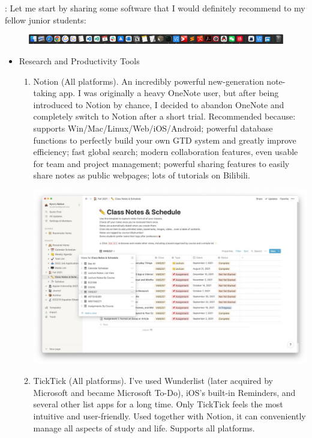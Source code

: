 \KW: Let me start by sharing some software that I would definitely recommend to my fellow junior students:
\begin{figure}[H]
    \includegraphics[width=\columnwidth]{author-folder/Kai.Wu/kai_mac_dock.jpg}
\end{figure}
\begin{itemize}
    \item Research and Productivity Tools
    \begin{enumerate}
        \item Notion (All platforms). An incredibly powerful new-generation note-taking app. I was originally a heavy OneNote user, but after being introduced to Notion by chance, I decided to abandon OneNote and completely switch to Notion after a short trial. Recommended because: supports Win/Mac/Linux/Web/iOS/Android; powerful database functions to perfectly build your own GTD system and greatly improve efficiency; fast global search; modern collaboration features, even usable for team and project management; powerful sharing features to easily share notes as public webpages; lots of tutorials on Bilibili.

        \includegraphics[width=0.8\columnwidth]{author-folder/Kai.Wu/notion.jpg}
        \item TickTick (All platforms). I've used Wunderlist (later acquired by Microsoft and became Microsoft To-Do), iOS's built-in Reminders, and several other list apps for a long time. Only TickTick feels the most intuitive and user-friendly. Used together with Notion, it can conveniently manage all aspects of study and life. Supports all platforms.


\end{enumerate}
\end{itemize}

